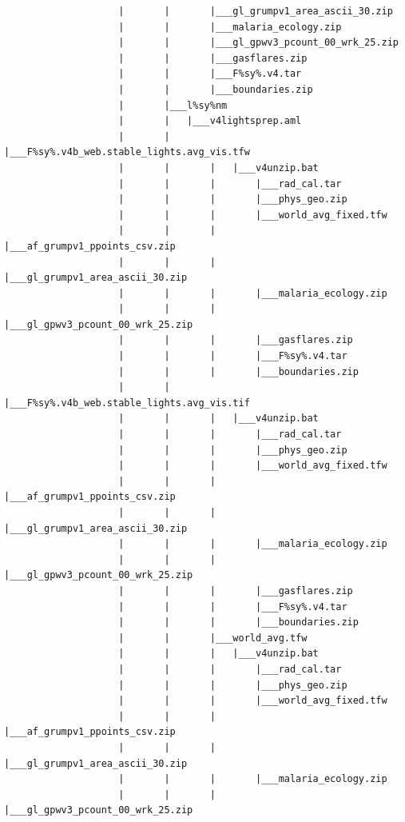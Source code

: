 \documentclass[]{book}
\begin{document}
\begin{verbatim}
                    |       |       |___gl_grumpv1_area_ascii_30.zip
                    |       |       |___malaria_ecology.zip
                    |       |       |___gl_gpwv3_pcount_00_wrk_25.zip
                    |       |       |___gasflares.zip
                    |       |       |___F%sy%.v4.tar
                    |       |       |___boundaries.zip
                    |       |___l%sy%nm
                    |       |   |___v4lightsprep.aml
                    |       |       |___F%sy%.v4b_web.stable_lights.avg_vis.tfw
                    |       |       |   |___v4unzip.bat
                    |       |       |       |___rad_cal.tar
                    |       |       |       |___phys_geo.zip
                    |       |       |       |___world_avg_fixed.tfw
                    |       |       |       |___af_grumpv1_ppoints_csv.zip
                    |       |       |       |___gl_grumpv1_area_ascii_30.zip
                    |       |       |       |___malaria_ecology.zip
                    |       |       |       |___gl_gpwv3_pcount_00_wrk_25.zip
                    |       |       |       |___gasflares.zip
                    |       |       |       |___F%sy%.v4.tar
                    |       |       |       |___boundaries.zip
                    |       |       |___F%sy%.v4b_web.stable_lights.avg_vis.tif
                    |       |       |   |___v4unzip.bat
                    |       |       |       |___rad_cal.tar
                    |       |       |       |___phys_geo.zip
                    |       |       |       |___world_avg_fixed.tfw
                    |       |       |       |___af_grumpv1_ppoints_csv.zip
                    |       |       |       |___gl_grumpv1_area_ascii_30.zip
                    |       |       |       |___malaria_ecology.zip
                    |       |       |       |___gl_gpwv3_pcount_00_wrk_25.zip
                    |       |       |       |___gasflares.zip
                    |       |       |       |___F%sy%.v4.tar
                    |       |       |       |___boundaries.zip
                    |       |       |___world_avg.tfw
                    |       |       |   |___v4unzip.bat
                    |       |       |       |___rad_cal.tar
                    |       |       |       |___phys_geo.zip
                    |       |       |       |___world_avg_fixed.tfw
                    |       |       |       |___af_grumpv1_ppoints_csv.zip
                    |       |       |       |___gl_grumpv1_area_ascii_30.zip
                    |       |       |       |___malaria_ecology.zip
                    |       |       |       |___gl_gpwv3_pcount_00_wrk_25.zip

\end{verbatim}
\end{document}
